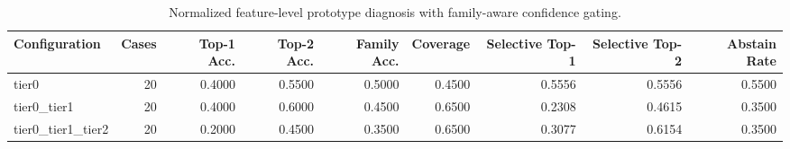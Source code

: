 \begin{table}[t]
\centering
\caption{Normalized feature-level prototype diagnosis with family-aware confidence gating.}
\label{tab:dice_stressor_hierarchical_diagnosis}
\footnotesize
\begin{tabular}{lrrrrrrrr}
\toprule
Configuration & Cases & Top-1 Acc. & Top-2 Acc. & Family Acc. & Coverage & Selective Top-1 & Selective Top-2 & Abstain Rate \\
\midrule
tier0 & 20 & 0.4000 & 0.5500 & 0.5000 & 0.4500 & 0.5556 & 0.5556 & 0.5500 \\
tier0_tier1 & 20 & 0.4000 & 0.6000 & 0.4500 & 0.6500 & 0.2308 & 0.4615 & 0.3500 \\
tier0_tier1_tier2 & 20 & 0.2000 & 0.4500 & 0.3500 & 0.6500 & 0.3077 & 0.6154 & 0.3500 \\
\bottomrule
\end{tabular}

\end{table}
